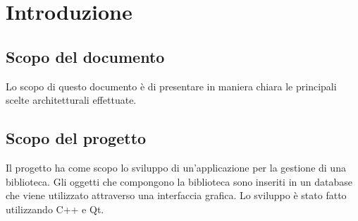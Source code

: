 \section{Introduzione}{
	\subsection{Scopo del documento}{
		Lo scopo di questo documento è di presentare in maniera chiara le principali scelte architetturali effettuate.
	}
	\subsection{Scopo del progetto}{
		Il progetto ha come scopo lo sviluppo di un'applicazione per la gestione di una biblioteca. Gli oggetti che compongono la biblioteca sono inseriti in un database che viene utilizzato attraverso una interfaccia grafica.
		Lo sviluppo è stato fatto utilizzando C++ e Qt. 
	}
}
